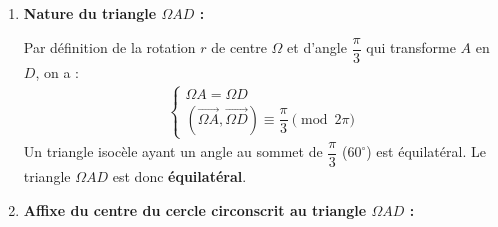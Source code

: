 \documentclass[12pt,a4paper]{article}
\begin{document}
\begin{enumerate}
    L'écriture complexe de la rotation $r$ de centre $\Omega(1)$ et d'angle $\theta$ est de la forme $z' - z_{\Omega} = e^{i\theta}(z - z_{\Omega})$. Comme $r(A) = D$, on a :
    $$
    \begin{aligned}
        e^{i\theta} &= \dfrac{z_D - z_{\Omega}}{z_A - z_{\Omega}} \\
        &= \dfrac{-\dfrac{1}{2} - i\dfrac{\sqrt{3}}{2} - 1}{-\dfrac{1}{2} + i\dfrac{\sqrt{3}}{2} - 1} \\
        &= \dfrac{-\dfrac{3}{2} - i\dfrac{\sqrt{3}}{2}}{-\dfrac{3}{2} + i\dfrac{\sqrt{3}}{2}} \\
        &= \dfrac{-3 - i\sqrt{3}}{-3 + i\sqrt{3}} \\
        &= \dfrac{(-3 - i\sqrt{3})(-3 - i\sqrt{3})}{(-3)^2 - (i\sqrt{3})^2} \\
        &= \dfrac{9 + 6i\sqrt{3} + 3i^2}{9 + 3} \\
        &= \dfrac{6 + 6i\sqrt{3}}{12} \\
        &= \dfrac{1}{2} + i\dfrac{\sqrt{3}}{2} \\
        &= e^{i\frac{\pi}{3}}
    \end{aligned}
    $$
    L'écriture complexe de $r$ est donc :
    $$
    \begin{aligned}
        z' - 1 = e^{i\frac{\pi}{3}}(z - 1) &\iff z' = e^{i\frac{\pi}{3}}z + 1 - e^{i\frac{\pi}{3}} \\
        &\iff z' = \left(\dfrac{1}{2} + i\dfrac{\sqrt{3}}{2}\right)z + \dfrac{1}{2} - i\dfrac{\sqrt{3}}{2}
    \end{aligned}
    $$

    \item \textbf{Nature du triangle $\Omega AD$ :}
    
    Par définition de la rotation $r$ de centre $\Omega$ et d'angle $\dfrac{\pi}{3}$ qui transforme $A$ en $D$, on a :
    $$
    \begin{aligned}
        \left\{
        \begin{array}{l}
            \Omega A = \Omega D \\
            \left(\overrightarrow{\Omega A}, \overrightarrow{\Omega D}\right) \equiv \dfrac{\pi}{3} \pmod{2\pi}
        \end{array}
        \right.
    \end{aligned}
    $$
    Un triangle isocèle ayant un angle au sommet de $\dfrac{\pi}{3}$ ($60^\circ$) est équilatéral. Le triangle $\Omega AD$ est donc \textbf{équilatéral}.

    \item \textbf{Affixe du centre du cercle circonscrit au triangle $\Omega AD$ :}
    

\end{enumerate}
\end{document}
